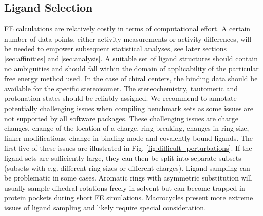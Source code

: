 \documentclass[9pt,bestpractices]{livecoms}
\begin{document}
\subsection{Ligand Selection}
\label{sec:dataset:ligands}
FE calculations are relatively costly in terms of computational effort. A certain number of data points, either activity measurements or activity differences, will be needed to empower subsequent statistical analyses, see later sections \ref{sec:affinities} and \ref{sec:analysis}. 
A suitable set of ligand structures should contain no ambiguities and should fall within the domain of applicability
of the particular free energy method used. 
In the case of chiral centers, the binding data should be available for the specific stereoisomer.
The stereochemistry, tautomeric and protonation states should be reliably assigned. 
%
We recommend to annotate potentially challenging issues when compiling benchmark sets as some issues are not supported by all
software packages. 
These challenging issues are 
charge changes, 
change of the location of a charge,
ring breaking,
changes in ring size, 
linker modifications,
change in binding mode and 
covalently bound ligands. 
The first five of these issues are illustrated in Fig. \ref{fig:difficult_perturbations}.
%
If the ligand sets are sufficiently large, they can then be split into separate subsets (subsets with e.g. different ring sizes or different charges).
%
Ligand sampling can be problematic in some cases. Aromatic rings with asymmetric substitution will usually sample dihedral rotations freely in solvent but can become trapped in protein pockets during short FE simulations.\cite{kaus_how_2015,sasmal_sampling_2020} Macrocycles present more extreme issues of ligand sampling and likely require special consideration.\cite{wagner_computational_2017,yu_accurate_2017,paulsen_evaluation_2020} 
\end{document}
